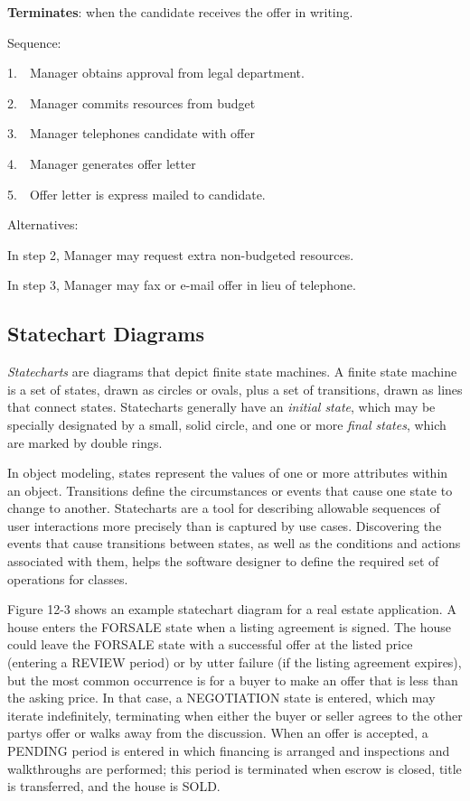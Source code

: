 \textbf{Terminates}: when the candidate receives the offer in writing.

Sequence:

1.\ \ Manager obtains approval from legal department.

2.\ \ Manager commits resources from budget

3.\ \ Manager telephones candidate with offer

4.\ \ Manager generates offer letter

5.\ \ Offer letter is express mailed to candidate.

Alternatives:

In step 2, Manager may request extra non-budgeted resources.

In step 3, Manager may fax or e-mail offer in lieu of telephone.

\subsection{Statechart Diagrams}

\textit{Statecharts} are diagrams that depict finite
state machines. A finite state machine is a
set of states, drawn as circles or ovals, plus a set of transitions,
drawn as lines that connect states. Statecharts generally have an
\textit{initial state}, which may be specially designated by a small,
solid circle, and one or more \textit{final states}, which are marked
by double rings.

In object modeling, states represent the values of one or more
attributes within an object. Transitions define the circumstances or
events that cause one state to change to another. Statecharts are a
tool for describing allowable sequences of user interactions more
precisely than is captured by use cases. Discovering the events that
cause transitions between states, as well as the conditions and actions
associated with them, helps the software designer to define the
required set of operations for classes.

Figure 12-3 shows an example statechart diagram for a real estate
application. A house enters the FORSALE state when a listing agreement
is signed. The house could leave the FORSALE state with a successful
offer at the listed price (entering a REVIEW period) or by utter
failure (if the listing agreement expires), but the most common
occurrence is for a buyer to make an offer that is less than the asking
price. In that case, a NEGOTIATION state is entered, which may iterate
indefinitely, terminating when either the buyer or seller agrees to the
other party{\textquotesingle}s offer or walks away from the discussion.
When an offer is accepted, a PENDING period is entered in which
financing is arranged and inspections and walkthroughs are performed;
this period is terminated when escrow is closed, title is transferred,
and the house is SOLD.


